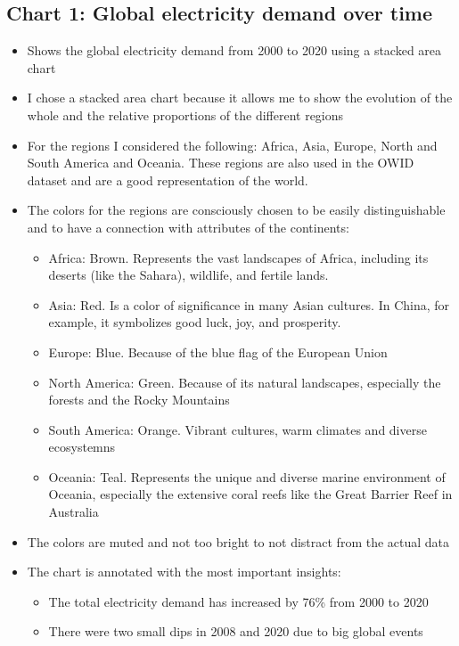 \documentclass{article}
\begin{document}
\subsection{Chart 1: Global electricity demand over time}
\begin{itemize}
    \item Shows the global electricity demand from 2000 to 2020 using a stacked area chart
    \item I chose a stacked area chart because it allows me to show the evolution of the whole and the relative proportions of the different regions
    \item For the regions I considered the following: Africa, Asia, Europe, North and South America and Oceania. These regions are also used in the OWID dataset and are a good representation of the world.
    \item The colors for the regions are consciously chosen to be easily distinguishable and to have a connection with attributes of the continents:
        \begin{itemize}
            \item Africa: Brown. Represents the vast landscapes of Africa, including its deserts (like the Sahara), wildlife, and fertile lands.
            \item Asia: Red. Is a color of significance in many Asian cultures. In China, for example, it symbolizes good luck, joy, and prosperity.
            \item Europe: Blue. Because of the blue flag of the European Union
            \item North America: Green. Because of its natural landscapes, especially the forests and the Rocky Mountains
            \item South America: Orange. Vibrant cultures, warm climates and diverse ecosystemns
            \item Oceania: Teal. Represents the unique and diverse marine environment of Oceania, especially the extensive  coral reefs like the Great Barrier Reef in Australia
        \end{itemize}
    \item The colors are muted and not too bright to not distract from the actual data
    \item The chart is annotated with the most important insights:
    \begin{itemize}
        \item The total electricity demand has increased by 76\% from 2000 to 2020
        \item There were two small dips in 2008 and 2020 due to big global events
    \end{itemize}
\end{itemize}
\end{document}
